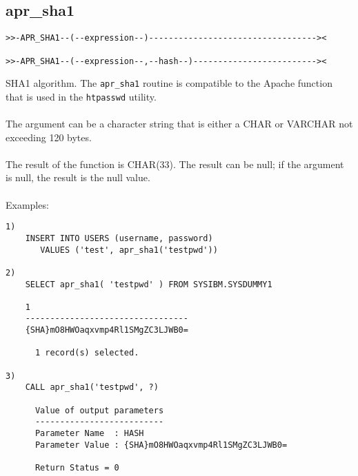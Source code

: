 \subsection{apr\_sha1} \label{aprsha1}
\begin{verbatim}
>>-APR_SHA1--(--expression--)----------------------------------><

>>-APR_SHA1--(--expression--,--hash--)-------------------------><
\end{verbatim}
SHA1 algorithm. The {\tt apr\_sha1} routine is compatible to the Apache function that is used in the {\tt htpasswd} utility.\\
\\
The argument can be a character string that is either a \mbox{CHAR} or \mbox{VARCHAR} not exceeding 120 bytes.\\
\\
The result of the function is CHAR(33). The result can be null; if the argument is null, the result is the null value.\\
\\
Examples:
\begin{verbatim}
1)
    INSERT INTO USERS (username, password)
       VALUES ('test', apr_sha1('testpwd'))

2)
    SELECT apr_sha1( 'testpwd' ) FROM SYSIBM.SYSDUMMY1

    1
    ---------------------------------
    {SHA}mO8HWOaqxvmp4Rl1SMgZC3LJWB0=

      1 record(s) selected.

3)
    CALL apr_sha1('testpwd', ?)

      Value of output parameters
      --------------------------
      Parameter Name  : HASH
      Parameter Value : {SHA}mO8HWOaqxvmp4Rl1SMgZC3LJWB0=

      Return Status = 0
\end{verbatim}
\newpage
\hypertarget{haprsha256}{}
